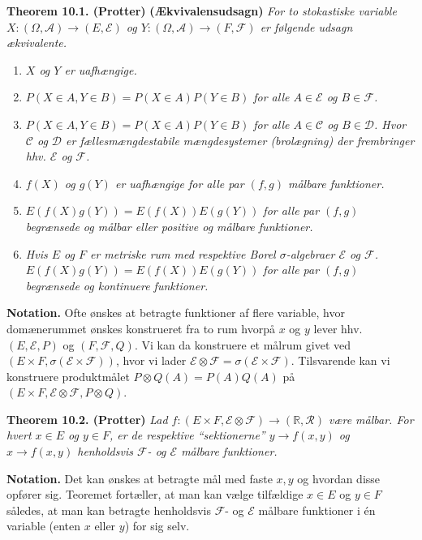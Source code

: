 \documentclass[
]{book}
\providecommand{\tightlist}{%
  \setlength{\itemsep}{0pt}\setlength{\parskip}{0pt}}
\begin{document}
\textbf{Theorem 10.1. (Protter)} \textbf{(Ækvivalensudsagn)} \emph{For to stokastiske variable \(X : (\Omega, \mathcal{A})\to (E,\mathcal{E})\) og \(Y : (\Omega, \mathcal{A})\to (F,\mathcal{F})\) er følgende udsagn ækvivalente.}

\begin{enumerate}
\def\labelenumi{\alph{enumi}.}
\setcounter{enumi}{14}
\tightlist
\item
  \emph{\(X\) og \(Y\) er uafhængige.}
\item
  \emph{\(P(X\in A, Y\in B)=P(X\in A)P(Y\in B)\) for alle \(A\in \mathcal{E}\) og \(B\in\mathcal{F}\).}
\item
  \emph{\(P(X\in A, Y\in B)=P(X\in A)P(Y\in B)\) for alle \(A\in \mathcal{C}\) og \(B\in\mathcal{D}\). Hvor \(\mathcal{C}\) og \(\mathcal{D}\) er fællesmængdestabile mængdesystemer (brolægning) der frembringer hhv. \(\mathcal{E}\) og \(\mathcal{F}\).}
\item
  \emph{\(f(X)\) og \(g(Y)\) er uafhængige for alle par \((f,g)\) målbare funktioner.}
\item
  \emph{\(E(f(X)g(Y))=E(f(X))E(g(Y))\) for alle par \((f,g)\) begrænsede og målbar eller positive og målbare funktioner.}
\item
  \emph{Hvis \(E\) og \(F\) er metriske rum med respektive Borel \(\sigma\)-algebraer \(\mathcal{E}\) og \(\mathcal{F}\). \(E(f(X)g(Y))=E(f(X))E(g(Y))\) for alle par \((f,g)\) begrænsede og kontinuere funktioner. }
\end{enumerate}

\textbf{Notation.} Ofte ønskes at betragte funktioner af flere variable, hvor domænerummet ønskes konstrueret fra to rum hvorpå \(x\) og \(y\) lever hhv. \((E,\mathcal{E},P)\) og \((F,\mathcal{F},Q)\). Vi kan da konstruere et målrum givet ved \((E\times F, \sigma(\mathcal{E}\times\mathcal{F}))\), hvor vi lader \(\mathcal{E}\otimes \mathcal{F}=\sigma(\mathcal{E}\times\mathcal{F})\). Tilsvarende kan vi konstruere produktmålet \(P\otimes Q(A)=P(A)Q(A)\) på \((E\times F, \mathcal{E}\otimes \mathcal{F},P\otimes Q)\).

\textbf{Theorem 10.2. (Protter)} \emph{Lad \(f : (E \times F, \mathcal{E} \otimes \mathcal{F}) \to (\mathbb{R}, \mathcal{R})\) være målbar. For hvert \(x \in E\) og \(y \in F\), er de respektive ``sektionerne'' \(y \to f(x,y)\) og \(x \to f(x,y)\) henholdsvis \(\mathcal{F}\)- og \(\mathcal{E}\) målbare funktioner.}

\textbf{Notation.} Det kan ønskes at betragte mål med faste \(x,y\) og hvordan disse opfører sig. Teoremet fortæller, at man kan vælge tilfældige \(x \in E\) og \(y \in F\) således, at man kan betragte henholdsvis \(\mathcal{F}\)- og \(\mathcal{E}\) målbare funktioner i én variable (enten \(x\) eller \(y\)) for sig selv.
\end{document}
